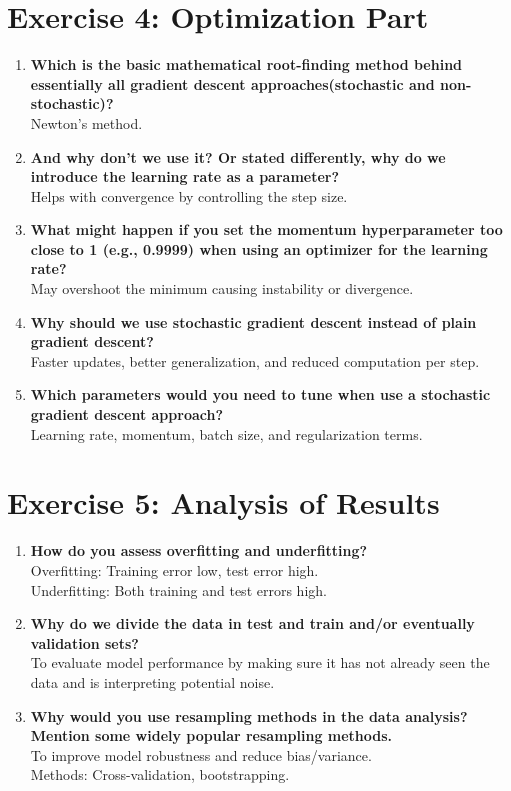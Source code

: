 \documentclass[a4paper,12pt]{article}
\begin{document}
	\section*{Exercise 4: Optimization Part}
	
	\begin{enumerate}
		\item \textbf{Which is the basic mathematical root-finding method behind essentially all gradient descent approaches(stochastic and non-stochastic)?} \\
		Newton's method.
		
		\item \textbf{And why don’t we use it? Or stated differently, why do we introduce the learning rate as a parameter?} \\
		Helps with convergence by controlling the step size.
		
		\item \textbf{What might happen if you set the momentum hyperparameter too close to 1 (e.g., 0.9999) when using an optimizer for the learning rate?} \\
		May overshoot the minimum causing instability or divergence.
		
		\item \textbf{Why should we use stochastic gradient descent instead of plain gradient descent?} \\
		Faster updates, better generalization, and reduced computation per step.
		
		\item \textbf{Which parameters would you need to tune when use a stochastic gradient descent approach?} \\
		Learning rate, momentum, batch size, and regularization terms.
	\end{enumerate}
	
	\section*{Exercise 5: Analysis of Results}
	
	\begin{enumerate}
		\item \textbf{How do you assess overfitting and underfitting?} \\
		Overfitting: Training error low, test error high. \\
		Underfitting: Both training and test errors high.
		
		\item \textbf{Why do we divide the data in test and train and/or eventually validation sets?} \\
		To evaluate model performance by making sure it has not already seen the data and is interpreting potential noise.
		
		\item \textbf{Why would you use resampling methods in the data analysis? Mention some widely popular resampling methods.} \\
		To improve model robustness and reduce bias/variance. \\
		Methods: Cross-validation, bootstrapping.
	\end{enumerate}
	
\end{document}

